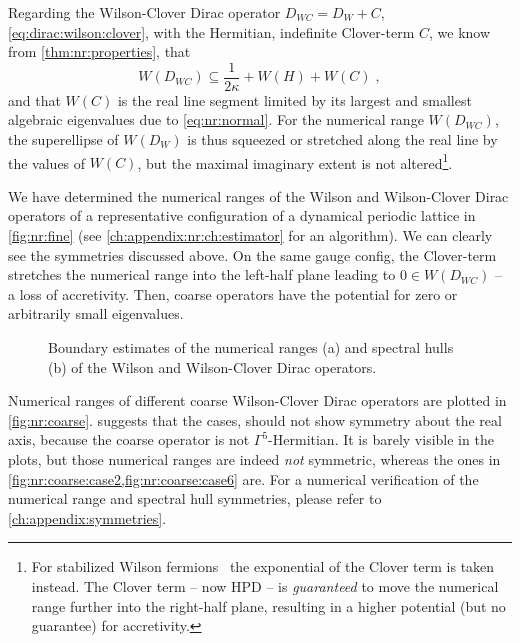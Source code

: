 Regarding the Wilson-Clover Dirac operator $D_{WC} = D_W + C$, \cref{eq:dirac:wilson:clover}, with the Hermitian,  indefinite Clover-term $C$, we know from \cref{thm:nr:properties}, that
\begin{equation}
W(D_{WC}) \subseteq  \frac{1}{2 \kappa} + W(H) + W(C) \;,
\end{equation}
and that $W(C)$ is the real line segment limited by its largest and smallest algebraic eigenvalues due to \cref{eq:nr:normal}.
For the numerical range $W(D_{WC})$, the superellipse of $W(D_{W})$ is thus squeezed or stretched along the real line by the values of $W(C)$, but the maximal imaginary extent is not altered\footnote{For stabilized Wilson fermions~\cite{Francis:2019muy} the exponential of the Clover term is taken instead. The Clover term -- now HPD -- is \emph{guaranteed} to move the numerical range further into the right-half plane, resulting in a higher potential (but no guarantee) for accretivity.}.

We have determined the numerical ranges of the Wilson and Wilson-Clover Dirac operators of a representative configuration of a dynamical periodic lattice in \cref{fig:nr:fine} (see \cref{ch:appendix:nr:ch:estimator} for an algorithm).
We can clearly see the symmetries discussed above.
On the same gauge config, the Clover-term stretches the numerical range into the left-half plane leading to $0 \in W(D_{WC})$ -- a loss of accretivity.
Then, coarse operators have the potential for zero or arbitrarily small eigenvalues.

\begin{figure}
\centering

\hfill
{}

\caption{
Boundary estimates of the numerical ranges (a) and spectral hulls (b) of the Wilson and Wilson-Clover Dirac operators.
}
\label{fig:fine}
\end{figure}

Numerical ranges of different coarse Wilson-Clover Dirac operators are plotted in \cref{fig:nr:coarse}.
 suggests that the  cases, should not show symmetry about the real axis, because the coarse operator is not $\Gamma^{5}$-Hermitian.
It is barely visible in the plots, but those numerical ranges are indeed \emph{not} symmetric, whereas the ones in \cref{fig:nr:coarse:case2,fig:nr:coarse:case6} are.
For a numerical verification of the numerical range and spectral hull symmetries, please refer to \cref{ch:appendix:symmetries}.

